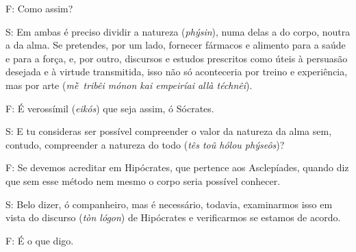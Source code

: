 F: Como assim?

 

S: Em ambas é preciso dividir a natureza (\emph{phýsin}), numa delas a
do corpo, noutra a da alma. Se pretendes, por um lado, fornecer fármacos
e alimento para a saúde e para a força, e, por outro, discursos e
estudos prescritos como úteis à persuasão desejada e à virtude
transmitida, isso não só aconteceria por treino e experiência, mas por
arte (\emph{mḕ~tribêi mónon kai empeiríai allà téchnêi}).

F: É verossímil (\emph{eikós}) que seja assim, ó Sócrates.

 

\bekker{[270c]} S: E tu consideras ser possível compreender o valor da
natureza da alma sem, contudo, compreender a natureza do todo (\emph{tês
toû hólou phýseôs})?

 

F: Se devemos acreditar em Hipócrates, que pertence aos Asclepíades,
quando diz que sem esse método nem mesmo o corpo seria possível
conhecer.

 

S: Belo dizer, ó companheiro, mas é necessário, todavia, examinarmos
isso em vista do discurso (\emph{tòn lógon}) de Hipócrates e
verificarmos se estamos de acordo.

 

F: É o que digo.

 


